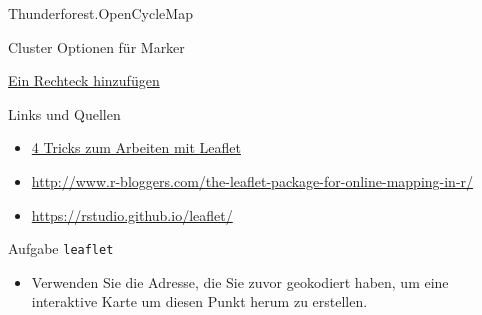 \documentclass[ignorenonframetext,]{beamer}
\newenvironment{Shaded}{}{}
\newcommand{\KeywordTok}[1]{\textcolor[rgb]{0.00,0.44,0.13}{\textbf{{#1}}}}
\newcommand{\DataTypeTok}[1]{\textcolor[rgb]{0.56,0.13,0.00}{{#1}}}
\newcommand{\FloatTok}[1]{\textcolor[rgb]{0.25,0.63,0.44}{{#1}}}
\newcommand{\StringTok}[1]{\textcolor[rgb]{0.25,0.44,0.63}{{#1}}}
\newcommand{\NormalTok}[1]{{#1}}
\providecommand{\tightlist}{%
\setlength{\itemsep}{0pt}\setlength{\parskip}{0pt}}
\begin{document}
\begin{frame}[fragile]{Thunderforest.OpenCycleMap}

\begin{Shaded}
\end{Shaded}

\end{frame}

\begin{frame}[fragile]{Cluster Optionen für Marker}

\begin{Shaded}
\end{Shaded}

\end{frame}

\begin{frame}[fragile]{\href{https://rstudio.github.io/leaflet/shapes.html}{Ein
Rechteck hinzufügen}}

\begin{Shaded}
\end{Shaded}

\end{frame}

\begin{frame}{Links und Quellen}

\begin{itemize}
\item
  \href{https://www.r-bloggers.com/4-tricks-for-working-with-r-leaflet-and-shiny/}{4
  Tricks zum Arbeiten mit Leaflet}
\item
  \url{http://www.r-bloggers.com/the-leaflet-package-for-online-mapping-in-r/}
\item
  \url{https://rstudio.github.io/leaflet/}
\end{itemize}

\end{frame}

\begin{frame}{Aufgabe \texttt{leaflet}}

\begin{itemize}
\tightlist
\item
  Verwenden Sie die Adresse, die Sie zuvor geokodiert haben, um eine
  interaktive Karte um diesen Punkt herum zu erstellen.
\end{itemize}

\end{frame}
\end{document}
